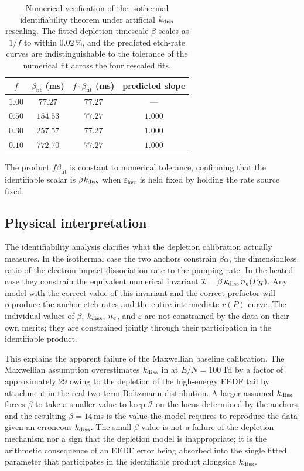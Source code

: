 \begin{table}[t]
\centering
\caption{Numerical verification of the isothermal identifiability
theorem under artificial $k_{\mathrm{diss}}$ rescaling. The fitted depletion
timescale $\beta$ scales as $1/f$ to within $0.02\,\%$, and the
predicted etch-rate curves are indistinguishable to the tolerance
of the numerical fit across the four rescaled fits.}
\label{tab:scaling}
\begin{tabular}{cccc}
\toprule
$f$ & $\beta_{\mathrm{fit}}$ (ms) &
$f\cdot\beta_{\mathrm{fit}}$ (ms) & predicted slope \\
\midrule
$1.00$ & $77.27$  & $77.27$ & --- \\
$0.50$ & $154.53$ & $77.27$ & $1.000$ \\
$0.30$ & $257.57$ & $77.27$ & $1.000$ \\
$0.10$ & $772.70$ & $77.27$ & $1.000$ \\
\bottomrule
\end{tabular}
\end{table}

The product $f\beta_{\mathrm{fit}}$ is constant to numerical
tolerance, confirming that the identifiable scalar is
$\beta k_{\mathrm{diss}}$ when $\varepsilon_{\mathrm{loss}}$ is held fixed by
holding the rate source fixed.

\subsection{Physical interpretation}
\label{sec:identifiability:physics}

The identifiability analysis clarifies what the depletion
calibration actually measures. In the isothermal case the two
anchors constrain $\beta\alpha$, the dimensionless ratio of the
electron-impact dissociation rate to the pumping rate. In the
heated case they constrain the equivalent numerical invariant
$\mathcal{I} = \beta\,k_{\mathrm{diss}}\,n_e(P_H)$. Any model with the
correct value of this invariant and the correct prefactor will
reproduce the anchor etch rates and the entire intermediate $r(P)$
curve. The individual values of $\beta$, $k_{\mathrm{diss}}$, $n_e$, and
$\varepsilon$ are not constrained by the data on their own merits;
they are constrained jointly through their participation in the
identifiable product.

This explains the apparent failure of the Maxwellian baseline
calibration. The Maxwellian assumption overestimates $k_{\mathrm{diss}}$ in
\sfsix{} at $E/N = 100\,$Td by a factor of approximately 29 owing
to the depletion of the high-energy EEDF tail by attachment in the
real two-term Boltzmann distribution. A larger assumed $k_{\mathrm{diss}}$
forces $\beta$ to take a smaller value to keep $\mathcal{I}$ on the
locus determined by the anchors, and the resulting
$\beta = 14\,$ms is the value the model requires to reproduce the
data given an erroneous $k_{\mathrm{diss}}$. The small-$\beta$ value is not a
failure of the depletion mechanism nor a sign that the depletion
model is inappropriate; it is the arithmetic consequence of an EEDF
error being absorbed into the single fitted parameter that
participates in the identifiable product alongside $k_{\mathrm{diss}}$.

